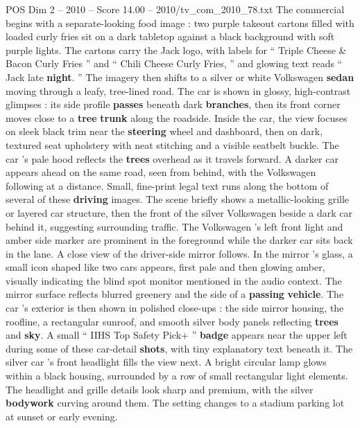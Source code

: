 \begin{textsample}{POS Dim 2 – 2010 – Score 14.00 – 2010/tv\_com\_2010\_78.txt}  \label{ex:f2_pos_057}
The commercial begins with a separate-looking food image : two purple takeout cartons filled with loaded curly fries sit on a dark tabletop against a black background with soft purple lights.
The cartons carry the Jack logo, with labels for “ Triple Cheese \& Bacon Curly Fries ” and “ Chili Cheese Curly Fries, ” and glowing text reads “ Jack late \textbf{night}. ” The imagery then shifts to a silver or white Volkswagen \textbf{sedan} moving through a leafy, tree-lined road.
The car is shown in glossy, high-contrast glimpses : its side profile \textbf{passes} beneath dark \textbf{branches}, then its front corner moves close to a \textbf{tree} \textbf{trunk} along the roadside.
Inside the car, the view focuses on sleek black trim near the \textbf{steering} wheel and dashboard, then on dark, textured seat upholstery with neat stitching and a visible seatbelt buckle.
The car ’s pale hood reflects the \textbf{trees} overhead as it travels forward.
A darker car appears ahead on the same road, seen from behind, with the Volkswagen following at a distance.
Small, fine-print legal text runs along the bottom of several of these \textbf{driving} images.
The scene briefly shows a metallic-looking grille or layered car structure, then the front of the silver Volkswagen beside a dark car behind it, suggesting surrounding traffic.
The Volkswagen ’s left front light and amber side marker are prominent in the foreground while the darker car sits back in the lane.
A close view of the driver-side mirror follows.
In the mirror ’s glass, a small icon shaped like two cars appears, first pale and then glowing amber, visually indicating the blind spot monitor mentioned in the audio context.
The mirror surface reflects blurred greenery and the side of a \textbf{passing} \textbf{vehicle}.
The car ’s exterior is then shown in polished close-ups : the side mirror housing, the roofline, a rectangular sunroof, and smooth silver body panels reflecting \textbf{trees} and \textbf{sky}.
A small “ IIHS Top Safety Pick+ ” \textbf{badge} appears near the upper left during some of these car-detail \textbf{shots}, with tiny explanatory text beneath it.
The silver car ’s front headlight fills the view next.
A bright circular lamp glows within a black housing, surrounded by a row of small rectangular light elements.
The headlight and grille details look sharp and premium, with the silver \textbf{bodywork} curving around them.
The setting changes to a stadium parking lot at sunset or early evening.

\end{textsample}
